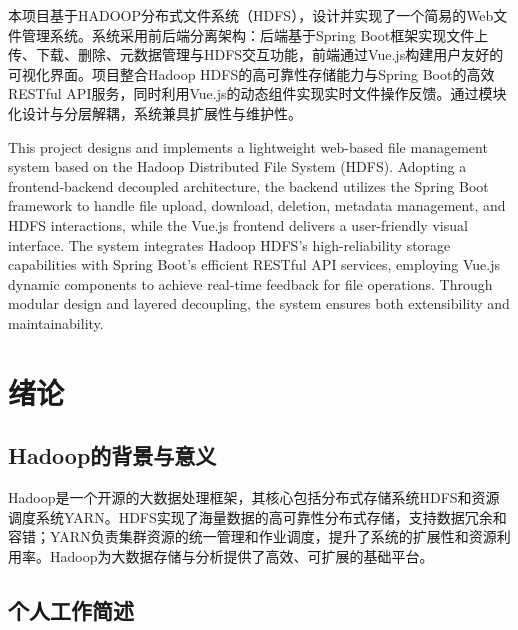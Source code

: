 \documentclass[bachelor]{thesis-uestc}
\begin{document}
\begin{chineseabstract}
本项目基于HADOOP分布式文件系统（HDFS），设计并实现了一个简易的Web文件管理系统。系统采用前后端分离架构：后端基于Spring Boot框架实现文件上传、下载、删除、元数据管理与HDFS交互功能，前端通过Vue.js构建用户友好的可视化界面。项目整合Hadoop HDFS的高可靠性存储能力与Spring Boot的高效RESTful API服务，同时利用Vue.js的动态组件实现实时文件操作反馈。通过模块化设计与分层解耦，系统兼具扩展性与维护性。

\end{chineseabstract}

\begin{englishabstract}
This project designs and implements a lightweight web-based file management system based on the Hadoop Distributed File System (HDFS). Adopting a frontend-backend decoupled architecture, the backend utilizes the Spring Boot framework to handle file upload, download, deletion, metadata management, and HDFS interactions, while the Vue.js frontend delivers a user-friendly visual interface. The system integrates Hadoop HDFS's high-reliability storage capabilities with Spring Boot's efficient RESTful API services, employing Vue.js dynamic components to achieve real-time feedback for file operations. Through modular design and layered decoupling, the system ensures both extensibility and maintainability.

\end{englishabstract}

\tableofcontents

\chapter{绪\hspace{6pt}论}

\section{Hadoop的背景与意义}
Hadoop是一个开源的大数据处理框架，其核心包括分布式存储系统HDFS和资源调度系统YARN。HDFS实现了海量数据的高可靠性分布式存储，支持数据冗余和容错；YARN负责集群资源的统一管理和作业调度，提升了系统的扩展性和资源利用率。Hadoop为大数据存储与分析提供了高效、可扩展的基础平台。


\section{个人工作简述}
\end{document}
